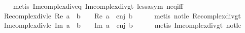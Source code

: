 \begin{isabellebody}
%
\isadelimproof
\ \ %
\endisadelimproof
%
\isatagproof
{}\isamarkupfalse%
\ {\isacharparenleft}{\kern0pt}metis\ Im{\isacharunderscore}{\kern0pt}complex{\isacharunderscore}{\kern0pt}div{\isacharunderscore}{\kern0pt}eq{\isacharunderscore}{\kern0pt}{}\ Im{\isacharunderscore}{\kern0pt}complex{\isacharunderscore}{\kern0pt}div{\isacharunderscore}{\kern0pt}gt{\isacharunderscore}{\kern0pt}{}\ less{\isacharunderscore}{\kern0pt}asym\ neq{\isacharunderscore}{\kern0pt}iff{\isacharparenright}{\kern0pt}%
\endisatagproof
{\isafoldproof}%
%
\isadelimproof
\isanewline
%
\endisadelimproof
\isanewline
{}\isamarkupfalse%
\ Re{\isacharunderscore}{\kern0pt}complex{\isacharunderscore}{\kern0pt}div{\isacharunderscore}{\kern0pt}le{\isacharunderscore}{\kern0pt}{}{\isacharcolon}{\kern0pt}\ {\isachardoublequoteopen}Re\ {\isacharparenleft}{\kern0pt}a\ {\isacharslash}{\kern0pt}\ b{\isacharparenright}{\kern0pt}\ {\isasymle}\ {}\ {\isasymlongleftrightarrow}\ Re\ {\isacharparenleft}{\kern0pt}a\ {\isacharasterisk}{\kern0pt}\ cnj\ b{\isacharparenright}{\kern0pt}\ {\isasymle}\ {}{\isachardoublequoteclose}\isanewline
%
\isadelimproof
\ \ %
\endisadelimproof
%
\isatagproof
{}\isamarkupfalse%
\ {\isacharparenleft}{\kern0pt}metis\ not{\isacharunderscore}{\kern0pt}le\ Re{\isacharunderscore}{\kern0pt}complex{\isacharunderscore}{\kern0pt}div{\isacharunderscore}{\kern0pt}gt{\isacharunderscore}{\kern0pt}{}{\isacharparenright}{\kern0pt}%
\endisatagproof
{\isafoldproof}%
%
\isadelimproof
\isanewline
%
\endisadelimproof
\isanewline
{}\isamarkupfalse%
\ Im{\isacharunderscore}{\kern0pt}complex{\isacharunderscore}{\kern0pt}div{\isacharunderscore}{\kern0pt}le{\isacharunderscore}{\kern0pt}{}{\isacharcolon}{\kern0pt}\ {\isachardoublequoteopen}Im\ {\isacharparenleft}{\kern0pt}a\ {\isacharslash}{\kern0pt}\ b{\isacharparenright}{\kern0pt}\ {\isasymle}\ {}\ {\isasymlongleftrightarrow}\ Im\ {\isacharparenleft}{\kern0pt}a\ {\isacharasterisk}{\kern0pt}\ cnj\ b{\isacharparenright}{\kern0pt}\ {\isasymle}\ {}{\isachardoublequoteclose}\isanewline
%
\isadelimproof
\ \ %
\endisadelimproof
%
\isatagproof
{}\isamarkupfalse%
\ {\isacharparenleft}{\kern0pt}metis\ Im{\isacharunderscore}{\kern0pt}complex{\isacharunderscore}{\kern0pt}div{\isacharunderscore}{\kern0pt}gt{\isacharunderscore}{\kern0pt}{}\ not{\isacharunderscore}{\kern0pt}le{\isacharparenright}{\kern0pt}%
\endisatagproof
{\isafoldproof}%
%
\isadelimproof
\isanewline
%
\endisadelimproof

\end{isabellebody}
